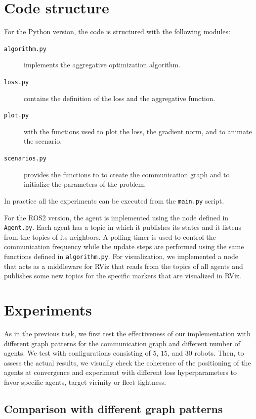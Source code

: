 \documentclass[a4paper,11pt,oneside]{book}
\begin{document}
\section{Code structure}
For the Python version, the code is structured with the following modules:
\begin{description}
      \item[\texttt{algorithm.py}] implements the aggregative optimization algorithm.
      \item[\texttt{loss.py}] contains the definition of the loss and the aggregative function.
      \item[\texttt{plot.py}] with the functions used to plot the loss, the gradient norm, and to animate the scenario.
      \item[\texttt{scenarios.py}] provides the functions to to create the communication graph and to initialize the parameters of the problem.
\end{description}
In practice all the experiments can be executed from the \texttt{main.py} script.

For the ROS2 version, the agent is implemented using the node defined in \texttt{Agent.py}. Each agent has a topic in which it publishes its states and it listens from the topics of its neighbors. A polling timer is used to control the communication frequency while the update steps are performed using the same functions defined in \texttt{algorithm.py}. For visualization, we implemented a node that acts as a middleware for RViz that reads from the topics of all agents and publishes some new topics for the specific markers that are visualized in RViz.



\section{Experiments}

As in the previous task, we first test the effectiveness of our implementation with different graph patterns for the communication graph and different number of agents. We test with configurations consisting of $5$, $15$, and $30$ robots. Then, to assess the actual results, we visually check the coherence of the positioning of the agents at convergence and experiment with different loss hyperparameters to favor specific agents, target vicinity or fleet tightness.


\subsection{Comparison with different graph patterns}
\end{document}
